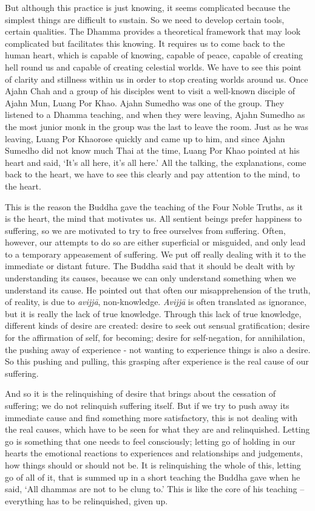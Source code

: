 But although this practice is just knowing, it seems complicated because
the simplest things are difficult to sustain. So we need to develop
certain tools, certain qualities. The Dhamma provides a theoretical
framework that may look complicated but facilitates this knowing. It
requires us to come back to the human heart, which is capable of
knowing, capable of peace, capable of creating hell round us and capable
of creating celestial worlds. We have to see this point of clarity and
stillness within us in order to stop creating worlds around us. Once
Ajahn Chah and a group of his disciples went to visit a well-known
disciple of Ajahn Mun, Luang Por Khao. Ajahn Sumedho was one of the
group. They listened to a Dhamma teaching, and when they were leaving, 
Ajahn Sumedho as the most junior monk in the group was the last to leave
the room. Just as he was leaving, Luang Por Khaorose quickly and came up
to him, and since Ajahn Sumedho did not know much Thai at the time, 
Luang Por Khao pointed at his heart and said, `It's all here, it's all
here.' All the talking, the explanations, come back to the heart, we
have to see this clearly and pay attention to the mind, to the heart. 

This is the reason the Buddha gave the teaching of the Four Noble
Truths, as it is the heart, the mind that motivates us. All sentient
beings prefer happiness to suffering, so we are motivated to try to free
ourselves from suffering. Often, however, our attempts to do so are
either superficial or misguided, and only lead to a temporary
appeasement of suffering. We put off really dealing with it to the
immediate or distant future. The Buddha said that it should be dealt
with by understanding its causes, because we can only understand
something when we understand its cause. He pointed out that often our
misapprehension of the truth, of reality, is due to \emph{avijjā}, 
non-knowledge. \emph{Avijjā} is often translated as ignorance, but it is
really the lack of true knowledge. Through this lack of true knowledge, 
different kinds of desire are created: desire to seek out sensual
gratification; desire for the affirmation of self, for becoming; desire
for self-negation, for annihilation, the pushing away of experience -
not wanting to experience things is also a desire. So this pushing and
pulling, this grasping after experience is the real cause of our
suffering. 

And so it is the relinquishing of desire that brings about the cessation
of suffering; we do not relinquish suffering itself. But if we try to
push away its immediate cause and find something more satisfactory, this
is not dealing with the real causes, which have to be seen for what they
are and relinquished. Letting go is something that one needs to feel
consciously; letting go of holding in our hearts the emotional reactions
to experiences and relationships and judgements, how things should or
should not be. It is relinquishing the whole of this, letting go of all
of it, that is summed up in a short teaching the Buddha gave when he
said, `All dhammas are not to be clung to.' This is like the core of his
teaching -- everything has to be relinquished, given up. 

